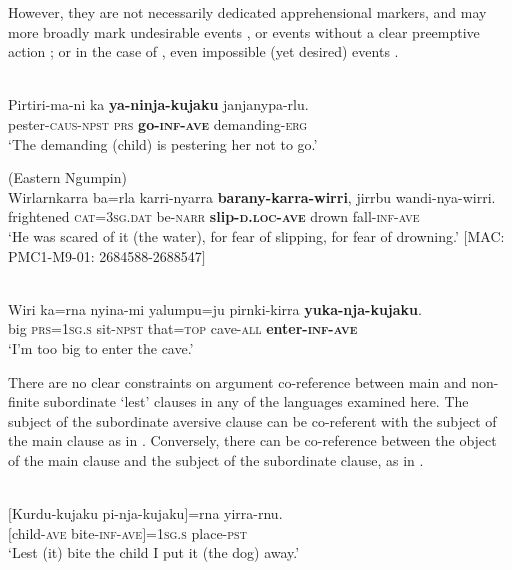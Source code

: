 \documentclass[output=paper,colorlinks,citecolor=brown]{langscibook}
\begin{document}
However, they are not necessarily dedicated apprehensional markers, and may more broadly mark undesirable events , or events without a clear preemptive action ; or in the case of , even impossible (yet desired) events .


\ea
{} {\citealt[53]{laughren_expressing_2015}} \\
\gll Pirtiri-ma-ni ka \textbf{ya-ninja-kujaku} janjanypa-rlu. \\
pester-\textsc{caus-npst} \textsc{prs} \textbf{go-\textsc{inf-ave}} demanding-\textsc{erg} \\
\glt `The demanding (child) is pestering her not to go.'
\label{ex:bro23}
\z

\ea 
\textnormal{ (Eastern Ngumpin)} \\
\gll Wirlarnkarra ba=rla karri-nyarra \textbf{barany-karra-wirri}, jirrbu wandi-nya-wirri. \\
frightened \textsc{cat=3sg.dat} be-\textsc{narr} \textbf{slip-\textsc{d.loc-ave}} drown fall-\textsc{inf-ave} \\
\glt `He was scared of it (the water), for fear of slipping, for fear of drowning.' $[$MAC: PMC1-M9-01: 2684588-2688547$]$
\label{ex:bro24}
\z

\ea
{} {\citealt[6]{laughren_expressing_2015}} \\
\gll Wiri ka=rna nyina-mi yalumpu=ju pirnki-kirra \textbf{yuka-nja-kujaku}. \\
big \textsc{prs=1sg.s} sit-\textsc{npst} that=\textsc{top} cave-\textsc{all} \textbf{enter-\textsc{inf-ave}} \\
\glt `I'm too big to enter the cave.'
\label{ex:bro25}
\z


 There are no clear constraints on argument co-reference between main and non-finite subordinate `lest' clauses in any of the  languages examined here. The subject of the subordinate aversive clause can be co-referent with the subject of the main clause as in . Conversely, there can be co-reference between the object of the main clause and the subject of the subordinate clause, as in .

\ea
{} {\citealt[5]{laughren_expressing_2015}} \\
\gll $[$Kurdu-kujaku pi-nja-kujaku$]$=rna yirra-rnu. \\
$[$child-\textsc{ave} bite-\textsc{inf-ave}$]$=\textsc{1sg.s} place-\textsc{pst} \\
\glt `Lest (it) bite the child I put it (the dog) away.'
\label{ex:bro26}
\z
\end{document}
